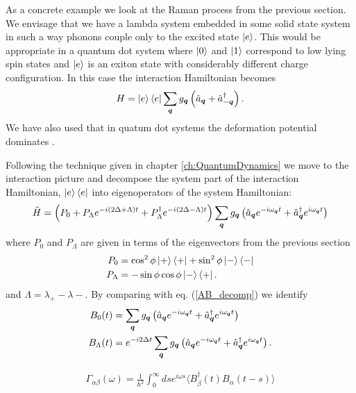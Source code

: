 As a concrete example we look at the Raman process from the previous section. We envisage that we have a lambda system embedded in some solid state system in such a way phonons couple only to the excited state $\left\vert e\right\rangle$. This would be appropriate in a quantum dot system where $\left\vert0\right\rangle$ and $\left\vert1\right\rangle$ correspond to low lying spin states and $\left\vert e\right\rangle$ is an exiton state with considerably different charge configuration. In this case the interaction Hamiltonian becomes
\begin{align}
  H = \left\vert e\right\rangle\left\langle e\right\vert\sum_{{\boldsymbol{q}}} g_{{\boldsymbol{q}}}\left(\hat{a}_{{\boldsymbol{q}}} + \hat{a}^\dagger_{-{\boldsymbol{q}}}\right).
\end{align}
We have also used that in quatum dot systems the deformation potential dominates \cite{gardiner+zoller, pazy, PhysRevB.65.195313, PhysRevB.66.165312}.

Following the technique given in chapter \ref{ch:QuantumDynamics} we move to the interaction picture and decompose the system part of the interaction Hamiltonian, $\left\vert e\right\rangle\left\langle e\right\vert$ into eigenoperators of the system Hamiltonian:
\begin{align}
  \tilde{H} = \left(P_0 + P_\Lambda e^{-i(2\Delta + \Lambda) t} + P^\dagger_\Lambda e^{-i(2\Delta - \Lambda) t}\right)\sum_{{\boldsymbol{q}}}g_{{\boldsymbol{q}}}\left(\hat{a}_{{\boldsymbol{q}}}e^{-i\omega_{{\boldsymbol{q}}} t} + \hat{a}^\dagger_{{\boldsymbol{q}}} e^{i\omega_{{\boldsymbol{q}}} t} \right)
\end{align}
where $P_0$ and $P_\Lambda$ are given in terms of the eigenvectors from the previous section
\begin{align}
  P_0 &= \cos^2\phi \left\vert+\right\rangle\left\langle +\right\vert + \sin^2\phi \left\vert-\right\rangle\left\langle -\right\vert \\
  P_\Lambda &= -\sin\phi \cos\phi \left\vert-\right\rangle\left\langle +\right\vert.
\end{align}
and $\Lambda = \lambda_{+} - \lambda{-}$. By comparing with eq. (\ref{AB_decomp}) we identify
\begin{align}
  B_0(t) &= \sum_{{\boldsymbol{q}}} g_{{\boldsymbol{q}}} \left(\hat{a}_{{\boldsymbol{q}}} e^{-i\omega_{{\boldsymbol{q}}} t} + \hat{a}^\dagger_{{\boldsymbol{q}}} e^{i\omega_{{\boldsymbol{q}}} t}\right) \\
  B_\Lambda(t) &= e^{-i2\Delta t}\sum_{{\boldsymbol{q}}} g_{{\boldsymbol{q}}} \left(\hat{a}_{{\boldsymbol{q}}} e^{-i\omega_{{\boldsymbol{q}}} t} + \hat{a}^\dagger_{{\boldsymbol{q}}} e^{i\omega_{{\boldsymbol{q}}} t}\right).
\end{align}

\begin{align}
  \Gamma_{\alpha\beta}(\omega) = \frac{1}{\hbar^2}\int_0^\infty ds e^{i\omega s}\langle B^\dagger_\beta(t) B_\alpha(t-s)\rangle
\end{align}

